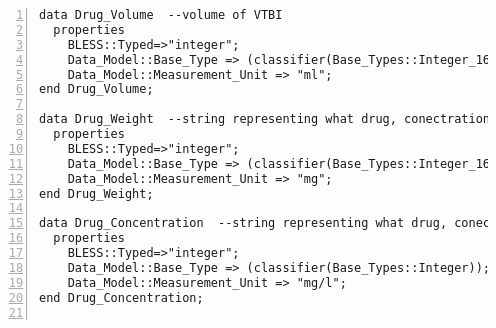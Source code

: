 \begin{lstlisting}[language=aadl, gobble=0, numbers=left, caption={\lstinline{PCA_Types} package}, label={listing:aadl:pca_types}]
data Drug_Volume  --volume of VTBI
  properties
    BLESS::Typed=>"integer";
    Data_Model::Base_Type => (classifier(Base_Types::Integer_16));
    Data_Model::Measurement_Unit => "ml";
end Drug_Volume;  

data Drug_Weight  --string representing what drug, conectration, and volume is in the reservoir
  properties
    BLESS::Typed=>"integer";
    Data_Model::Base_Type => (classifier(Base_Types::Integer_16));
    Data_Model::Measurement_Unit => "mg";
end Drug_Weight;

data Drug_Concentration  --string representing what drug, conectration, and volume is in the reservoir
  properties
    BLESS::Typed=>"integer";
    Data_Model::Base_Type => (classifier(Base_Types::Integer));
    Data_Model::Measurement_Unit => "mg/l";
end Drug_Concentration;


\end{lstlisting}

